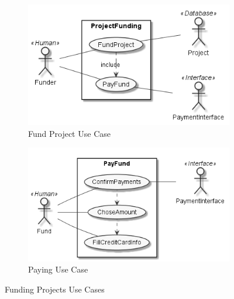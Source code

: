 \begin{figure}
      \centering
      \begin{subfigure}[b]{0.45\textwidth}
          \centering
          \includegraphics[width=\textwidth]{assets/FundingProject.png}
          \caption{Fund Project Use Case}
          \label{fig:funding project uc}
      \end{subfigure}
      \hfill
      \begin{subfigure}[b]{0.45\textwidth}
          \centering
          \includegraphics[width=\textwidth]{assets/UC31-PayFund.png}
          \caption{Paying Use Case}
          \label{fig:paying funds uc}
      \end{subfigure}
         \caption{Funding Projects Use Cases}
         \label{fig:fund project ucs}
 \end{figure}

